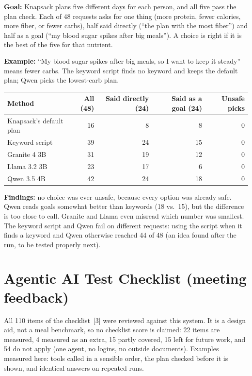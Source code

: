 \documentclass[11pt]{article}
\begin{document}
\textbf{Goal:} Knapsack plans five different days for each person, and all five
pass the plan check. Each of 48 requests asks for one thing (more protein, fewer
calories, more fiber, or fewer carbs), half said directly (``the plan with the
most fiber'') and half as a goal (``my blood sugar spikes after big meals''). A
choice is right if it is the best of the five for that nutrient.

\textbf{Example:} ``My blood sugar spikes after big meals, so I want to keep it
steady'' means fewer carbs. The keyword script finds no keyword and keeps the
default plan; Qwen picks the lowest-carb plan.

{\small
\begin{center}
\begin{tabular}{@{}lrrrr@{}}
\toprule
Method & All (48) & Said directly (24) & Said as a goal (24) & Unsafe picks \\
\midrule
Knapsack's default plan & 16 & 8 & 8 & 0 \\
Keyword script & 39 & 24 & 15 & 0 \\
Granite 4 3B & 31 & 19 & 12 & 0 \\
Llama 3.2 3B & 23 & 17 & 6 & 0 \\
Qwen 3.5 4B & 42 & 24 & 18 & 0 \\
\bottomrule
\end{tabular}
\end{center}}

\textbf{Findings:} no choice was ever unsafe, because every option was already
safe. Qwen reads goals somewhat better than keywords (18 vs.\ 15), but the
difference is too close to call. Granite and Llama even misread which number was
smallest. The keyword script and Qwen fail on different requests: using the
script when it finds a keyword and Qwen otherwise reached 44 of 48 (an idea
found after the run, to be tested properly next).

\section{Agentic AI Test Checklist (meeting feedback)}

All 110 items of the checklist~[3] were reviewed against this system. It is a
design aid, not a meal benchmark, so no checklist score is claimed: 22 items are
measured, 4 measured as an extra, 15 partly covered, 15 left for future work, and
54 do not apply (one agent, no logins, no outside documents). Examples measured
here: tools called in a sensible order, the plan checked before it is shown, and
identical answers on repeated runs.
\end{document}
